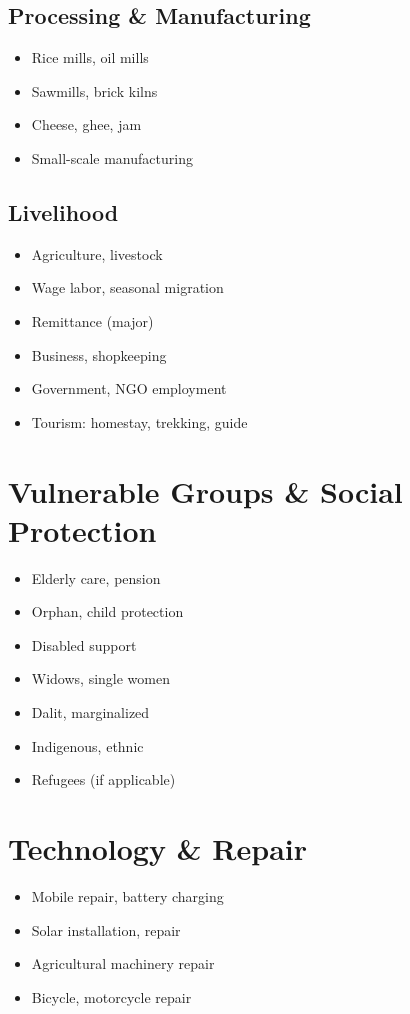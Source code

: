 \documentclass[11pt,a4paper]{article}
\begin{document}
\subsection{Processing \& Manufacturing}
\begin{itemize}
    \item Rice mills, oil mills
    \item Sawmills, brick kilns
    \item Cheese, ghee, jam
    \item Small-scale manufacturing
\end{itemize}

\subsection{Livelihood}
\begin{itemize}
    \item Agriculture, livestock
    \item Wage labor, seasonal migration
    \item Remittance (major)
    \item Business, shopkeeping
    \item Government, NGO employment
    \item Tourism: homestay, trekking, guide
\end{itemize}

\section{Vulnerable Groups \& Social Protection}
\begin{itemize}
    \item Elderly care, pension
    \item Orphan, child protection
    \item Disabled support
    \item Widows, single women
    \item Dalit, marginalized
    \item Indigenous, ethnic
    \item Refugees (if applicable)
\end{itemize}

\section{Technology \& Repair}
\begin{itemize}
    \item Mobile repair, battery charging
    \item Solar installation, repair
    \item Agricultural machinery repair
    \item Bicycle, motorcycle repair
\end{itemize}
\end{document}
